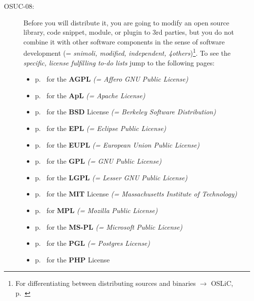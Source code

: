 \begin{description}
\item[OSUC-08:]\label{OSUC-08-DEF} Before you will distribute it, you are going
to modify an open source library, code snippet, module, or plugin to 3rd
parties, but you do not combine it with other software components in the sense
of software development (= \textit{snimoli, modified, independent,
4others})\footnote{For differentiating between distributing sources and binaries
$\rightarrow$ OSLiC, p.\ \pageref{sec:SourceBinaryDifference}}. To see the
\textit{specific, license fulfilling to-do lists} jump to the following pages:
  \begin{itemize}
    \item p.\ \pageref{OSUC-08-AGPL} for the \textbf{AGPL}
      \textit{(= Affero GNU Public License)} 
    \item p.\ \pageref{OSUC-08-Apache20} for the \textbf{ApL}
      \textit{(= Apache License)}
    \item p.\ \pageref{OSUC-08-BSD} for the \textbf{BSD} License
      \textit{(= Berkeley Software Distribution)}
    \item p.\ \pageref{OSUC-08-EPL} for the \textbf{EPL}
      \textit{(= Eclipse Public License)}     
    \item p.\ \pageref{OSUC-08-EUPL} for the \textbf{EUPL}
      \textit{(= European Union Public License)} 
    \item p.\ \pageref{OSUC-08-GPL} for the \textbf{GPL}
       \textit{(= GNU Public License)} 
    \item p.\ \pageref{OSUC-08-LGPL} for the \textbf{LGPL}
      \textit{(= Lesser GNU Public License)}           
    \item p.\ \pageref{OSUC-08-MIT} for the \textbf{MIT} License
       \textit{(= Massachusetts Institute of Technology)} 
    \item p.\ \pageref{OSUC-08-MPL} for \textbf{MPL}
      \textit{(= Mozilla Public License)}     
    \item p.\ \pageref{OSUC-08-MS-PL} for the \textbf{MS-PL}
      \textit{(= Microsoft Public License)} 
    \item p.\ \pageref{OSUC-08-PGL} for the \textbf{PGL}
      \textit{(= Postgres License)} 
    \item p.\ \pageref{OSUC-08-PHP} for the \textbf{PHP} License 
  \end{itemize}



\end{description}
